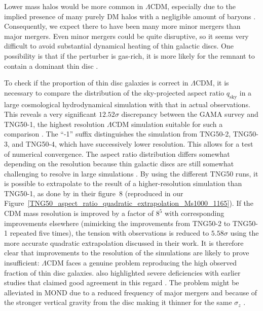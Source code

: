 \documentclass[fleqn,usenatbib,useAMS]{mnras} %
\begin{document}
Lower mass halos would be more common in $\Lambda$CDM, especially due to the implied presence of many purely DM halos with a negligible amount of baryons \citep[e.g.][]{Kim_2018}. Consequently, we expect there to have been many more minor mergers than major mergers. Even minor mergers could be quite disruptive, so it seems very difficult to avoid substantial dynamical heating of thin galactic discs. One possibility is that if the perturber is gas-rich, it is more likely for the remnant to contain a dominant thin disc \citep{Hopkins_2009}.

To check if the proportion of thin disc galaxies is correct in $\Lambda$CDM, it is necessary to compare the distribution of the sky-projected aspect ratio $q_{\mathrm{sky}}$ in a large cosmological hydrodynamical simulation with that in actual observations. This reveals a very significant $12.52\sigma$ discrepancy between the GAMA survey and TNG50-1, the highest resolution $\Lambda$CDM simulation suitable for such a comparison \citep{Haslbauer_2022}. The ``-1'' suffix distinguishes the simulation from TNG50-2, TNG50-3, and TNG50-4, which have successively lower resolution. This allows for a test of numerical convergence. The aspect ratio distribution differs somewhat depending on the resolution because thin galactic discs are still somewhat challenging to resolve in large simulations \citep{Ludlow_2021}. By using the different TNG50 runs, it is possible to extrapolate to the result of a higher-resolution simulation than TNG50-1, as done by \citet{Haslbauer_2022} in their figure~8 (reproduced in our Figure~\ref{TNG50_aspect_ratio_quadratic_extrapolation_Ms1000_1165}). If the CDM mass resolution is improved by a factor of $8^5$ with corresponding improvements elsewhere (mimicking the improvements from TNG50-2 to TNG50-1 repeated five times), the tension with observations is reduced to $5.58\sigma$ using the more accurate quadratic extrapolation discussed in their work. It is therefore clear that improvements to the resolution of the simulations are likely to prove insufficient: $\Lambda$CDM faces a genuine problem reproducing the high observed fraction of thin disc galaxies. \citet{Haslbauer_2022} also highlighted severe deficiencies with earlier studies that claimed good agreement in this regard \citep{Vogelsberger_2014, Bottrell_2017a, Bottrell_2017b}. The problem might be alleviated in MOND due to a reduced frequency of major mergers and because of the stronger vertical gravity from the disc making it thinner for the same $\sigma_z$ \citep{McGaugh_1998}.
\end{document}

